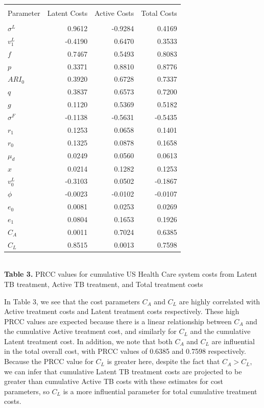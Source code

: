 \documentclass{amsart}
\begin{document}
\begin{table}[h]
\centering
\begin{tabular}{l r r r}
\hline\hline\\
Parameter & Latent Costs & Active Costs & Total Costs\\ [0.5ex]
\hline\\
$\sigma^{L}$  & 0.9612  & -0.9284 & 0.4169 \\
$v^{L}_{1}$   & -0.4190 & 0.6470  & 0.3533 \\
$f$                 & 0.7467  & 0.5493  & 0.8083 \\
$p$                & 0.3371  & 0.8810  & 0.8776 \\
$ARI_{0}$      & 0.3920  & 0.6728  & 0.7337 \\
$q$                & 0.3837  & 0.6573  & 0.7200 \\
$g$                & 0.1120  & 0.5369  & 0.5182 \\
$\sigma^{F}$ & -0.1138 & -0.5631 &-0.5435 \\
$r_{1}$          & 0.1253 &  0.0658  & 0.1401 \\
$r_{0}$          & 0.1325  & 0.0878  & 0.1658 \\
$\mu_{d}$      & 0.0249 & 0.0560  & 0.0613 \\
$x$                 & 0.0214 & 0.1282  & 0.1253 \\
$v^{L}_{0}$   & -0.3103 & 0.0502  &-0.1867 \\
$\phi$            & -0.0023 & -0.0102 &-0.0107 \\
$e_{0}$          & 0.0081 & 0.0253   & 0.0269 \\
$e_{1}$          & 0.0804 & 0.1653   & 0.1926 \\
$C_{A}$          & 0.0011 & 0.7024   & 0.6385 \\
$C_{L}$           & 0.8515 & 0.0013  & 0.7598 \\ [1ex]
\hline
\end{tabular}\\[1ex]

{\bf Table 3.} PRCC values for cumulative US Health Care system costs from 
Latent TB treatment, Active TB treatment, and Total treatment costs
\end{table}

In Table 3, we see that the cost parameters $C_{A}$ and $C_{L}$ are highly correlated with Active treatment costs and Latent treatment costs respectively.  These high PRCC values are expected because there is a linear relationship between $C_{A}$ and the cumulative Active treatment cost, and similarly for $C_{L}$ and the cumulative Latent treatment cost.  In addition, we note that both $C_{A}$ and $C_{L}$ are influential in the total overall cost, with PRCC values of 0.6385 and 0.7598 respectively.  Because the PRCC value for $C_{L}$ is greater here, despite the fact that $C_{A} > C_{L}$, we can infer that cumulative Latent TB treatment costs are projected to be greater than cumulative Active TB costs with these estimates for cost parameters, so $C_{L}$ is a more influential parameter for total cumulative treatment costs.  \\
\end{document}
